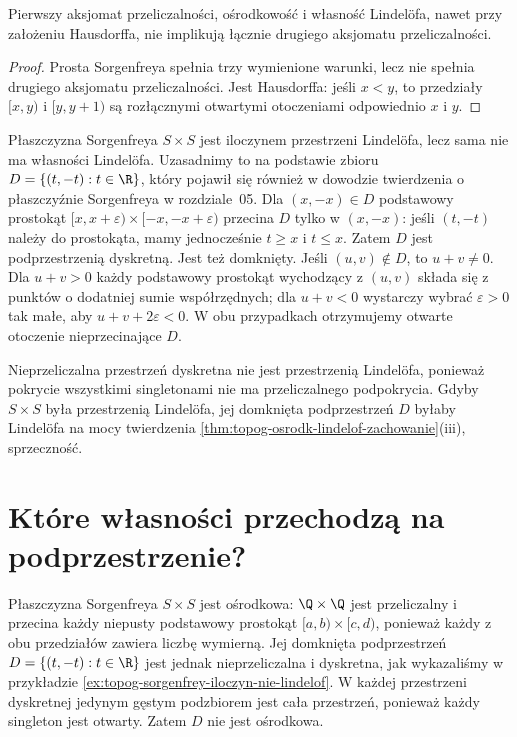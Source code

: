 \begin{wniosek}
\label{cor:topog-sorgenfrey-trzy-nie-druga}
Pierwszy aksjomat przeliczalności, ośrodkowość
i własność Lindelöfa, nawet przy założeniu Hausdorffa,
nie implikują łącznie drugiego aksjomatu przeliczalności.
\end{wniosek}
\begin{proof}
Prosta Sorgenfreya spełnia trzy wymienione warunki,
lecz nie spełnia drugiego aksjomatu przeliczalności.
Jest Hausdorffa:
jeśli $x<y$, to przedziały $[x,y)$ i $[y,y+1)$
są rozłącznymi otwartymi otoczeniami odpowiednio $x$ i $y$.
\end{proof}

\begin{przyklad}
\label{ex:topog-sorgenfrey-iloczyn-nie-lindelof}
Płaszczyzna Sorgenfreya $S\times S$ jest iloczynem
przestrzeni Lindelöfa, lecz sama nie ma własności Lindelöfa.
Uzasadnimy to na podstawie zbioru
$D=\{(t,-t):t\in\R\}$, który pojawił się również
w dowodzie twierdzenia o płaszczyźnie Sorgenfreya
w rozdziale~05.
Dla $(x,-x)\in D$ podstawowy prostokąt
$[x,x+\varepsilon)\times[-x,-x+\varepsilon)$
przecina $D$ tylko w $(x,-x)$: jeśli $(t,-t)$ należy
do prostokąta, mamy jednocześnie $t\ge x$ i $t\le x$.
Zatem $D$ jest podprzestrzenią dyskretną.
Jest też domknięty. Jeśli $(u,v)\notin D$, to $u+v\ne0$.
Dla $u+v>0$ każdy podstawowy prostokąt wychodzący
z $(u,v)$ składa się z punktów o dodatniej sumie
współrzędnych; dla $u+v<0$ wystarczy wybrać
$\varepsilon>0$ tak małe, aby $u+v+2\varepsilon<0$.
W obu przypadkach otrzymujemy otwarte otoczenie
nieprzecinające $D$.

Nieprzeliczalna przestrzeń dyskretna nie jest przestrzenią
Lindelöfa, ponieważ pokrycie wszystkimi singletonami
nie ma przeliczalnego podpokrycia. Gdyby $S\times S$
była przestrzenią Lindelöfa, jej domknięta podprzestrzeń
$D$ byłaby Lindelöfa na mocy twierdzenia
\ref{thm:topog-osrodk-lindelof-zachowanie}(iii), sprzeczność.
\end{przyklad}

\section{Które własności przechodzą na podprzestrzenie?}
\label{sec:topog-przeliczalnosc-kontrprzyklady}

\begin{przyklad}
\label{ex:topog-osrodkowosc-nie-dziedziczna}
Płaszczyzna Sorgenfreya $S\times S$ jest ośrodkowa:
$\Q\times\Q$ jest przeliczalny i przecina każdy
niepusty podstawowy prostokąt
$[a,b)\times[c,d)$, ponieważ każdy z obu przedziałów
zawiera liczbę wymierną. Jej domknięta podprzestrzeń
$D=\{(t,-t):t\in\R\}$ jest jednak nieprzeliczalna
i dyskretna, jak wykazaliśmy w przykładzie
\ref{ex:topog-sorgenfrey-iloczyn-nie-lindelof}.
W każdej przestrzeni dyskretnej jedynym gęstym podzbiorem
jest cała przestrzeń, ponieważ każdy singleton jest otwarty.
Zatem $D$ nie jest ośrodkowa.
\end{przyklad}

